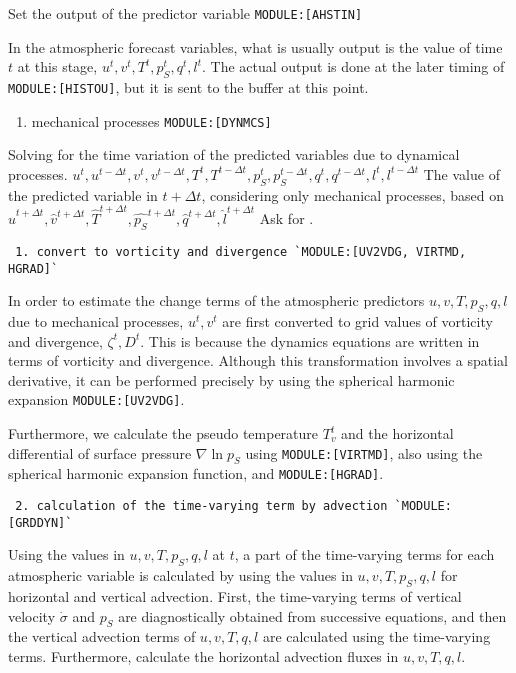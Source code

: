 Set the output of the predictor variable \texttt{MODULE:{[}AHSTIN{]}}

In the atmospheric forecast variables, what is usually output is the
value of time \(t\) at this stage,
\(u^{t}, v^{t}, T^{t}, p_S^{t}, q^{t}, l^{t}\). The actual output is
done at the later timing of \texttt{MODULE:{[}HISTOU{]}}, but it is sent
to the buffer at this point.

\begin{enumerate}
\def\labelenumi{\arabic{enumi}.}
\setcounter{enumi}{3}
\tightlist
\item
  mechanical processes \texttt{MODULE:{[}DYNMCS{]}}
\end{enumerate}

Solving for the time variation of the predicted variables due to
dynamical processes.
\(u^{t}, u^{t-\Delta t}, v^{t}, v^{t-\Delta t}, T^{t}, T^{t-\Delta t}, p_S^{t}, p_S^{t-\Delta t}, q^{t}, q^{t-\Delta t}, l^{t}, l^{t-\Delta t}\)
The value of the predicted variable in \(t+\Delta t\), considering only
mechanical processes, based on
\(\hat{u}^{t+\Delta t}, \hat{v}^{t+\Delta t}, \hat{T}^{t+\Delta t}, \hat{p_S}^{t+\Delta t}, \hat{q}^{t+\Delta t}, \hat{l}^{t+\Delta t}\)
Ask for .

\begin{verbatim}
 1. convert to vorticity and divergence `MODULE:[UV2VDG, VIRTMD, HGRAD]`
\end{verbatim}

In order to estimate the change terms of the atmospheric predictors
\(u, v, T, p_S, q, l\) due to mechanical processes, \(u^{t}, v^{t}\) are
first converted to grid values of vorticity and divergence,
\(\zeta^{t},D^{t}\). This is because the dynamics equations are written
in terms of vorticity and divergence. Although this transformation
involves a spatial derivative, it can be performed precisely by using
the spherical harmonic expansion \texttt{MODULE:{[}UV2VDG{]}}.

Furthermore, we calculate the pseudo temperature \(T_v^{t}\) and the
horizontal differential of surface pressure \(\nabla \ln p_S\) using
\texttt{MODULE:{[}VIRTMD{]}}, also using the spherical harmonic
expansion function, and \texttt{MODULE:{[}HGRAD{]}}.

\begin{verbatim}
 2. calculation of the time-varying term by advection `MODULE:[GRDDYN]`
\end{verbatim}

Using the values in \(u, v, T, p_S, q, l\) at \(t\), a part of the
time-varying terms for each atmospheric variable is calculated by using
the values in \(u, v, T, p_S, q, l\) for horizontal and vertical
advection. First, the time-varying terms of vertical velocity
\(\dot{\sigma}\) and \(p_S\) are diagnostically obtained from successive
equations, and then the vertical advection terms of \(u, v, T, q, l\)
are calculated using the time-varying terms. Furthermore, calculate the
horizontal advection fluxes in \(u, v, T, q, l\).


